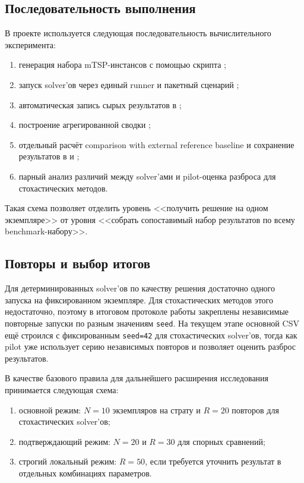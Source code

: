 \documentclass[a4paper,12pt]{article}
\begin{document}
\subsection{Последовательность выполнения}

В проекте используется следующая последовательность вычислительного эксперимента:
\begin{enumerate}[label=\arabic*.]
  \item генерация набора mTSP-инстансов с помощью скрипта ;
  \item запуск solver'ов через единый runner  и пакетный сценарий ;
  \item автоматическая запись сырых результатов в ;
  \item построение агрегированной сводки ;
  \item отдельный расчёт comparison with external reference baseline и сохранение результатов в  и ;
  \item парный анализ различий между solver'ами и pilot-оценка разброса для стохастических методов.
\end{enumerate}

Такая схема позволяет отделить уровень <<получить решение на одном экземпляре>> от уровня <<собрать сопоставимый набор результатов по всему benchmark-набору>>.

\subsection{Повторы и выбор итогов}

Для детерминированных solver'ов по качеству решения достаточно одного запуска на фиксированном экземпляре. Для стохастических методов этого недостаточно, поэтому в итоговом протоколе работы закреплены независимые повторные запуски по разным значениям \texttt{seed}. На текущем этапе основной CSV ещё строился с фиксированным \texttt{seed=42} для стохастических solver'ов, тогда как pilot уже использует серию независимых повторов и позволяет оценить разброс результатов.

В качестве базового правила для дальнейшего расширения исследования принимается следующая схема:
\begin{enumerate}[label=\arabic*.]
  \item основной режим: \(N=10\) экземпляров на страту и \(R=20\) повторов для стохастических solver'ов;
  \item подтверждающий режим: \(N=20\) и \(R=30\) для спорных сравнений;
  \item строгий локальный режим: \(R=50\), если требуется уточнить результат в отдельных комбинациях параметров.
\end{enumerate}
\end{document}
